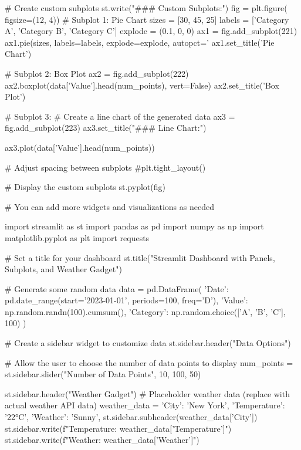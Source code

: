 # Create custom subplots
st.write("### Custom Subplots:")
fig = plt.figure( figsize=(12, 4))
# Subplot 1: Pie Chart
sizes = [30, 45, 25]
labels = ['Category A', 'Category B', 'Category C']
explode = (0.1, 0, 0)
ax1 = fig.add_subplot(221)
ax1.pie(sizes, labels=labels, explode=explode, autopct='%
ax1.set_title('Pie Chart')

# Subplot 2: Box Plot
ax2 = fig.add_subplot(222)
ax2.boxplot(data['Value'].head(num_points), vert=False)
ax2.set_title('Box Plot')


# Subplot 3: # Create a line chart of the generated data
ax3 = fig.add_subplot(223)
ax3.set_title("### Line Chart:")

ax3.plot(data['Value'].head(num_points))




# Adjust spacing between subplots
#plt.tight_layout()

# Display the custom subplots
st.pyplot(fig)

# You can add more widgets and visualizations as needed













import streamlit as st
import pandas as pd
import numpy as np
import matplotlib.pyplot as plt
import requests

# Set a title for your dashboard
st.title("Streamlit Dashboard with Panels, Subplots, and Weather Gadget")

# Generate some random data
data = pd.DataFrame({
    'Date': pd.date_range(start='2023-01-01', periods=100, freq='D'),
    'Value': np.random.randn(100).cumsum(),
    'Category': np.random.choice(['A', 'B', 'C'], 100)
})

# Create a sidebar widget to customize data
st.sidebar.header("Data Options")

# Allow the user to choose the number of data points to display
num_points = st.sidebar.slider("Number of Data Points", 10, 100, 50)

 
st.sidebar.header("Weather Gadget")
# Placeholder weather data (replace with actual weather API data)
weather_data = {
    'City': 'New York',
    'Temperature': '22°C',
    'Weather': 'Sunny',
}
st.sidebar.subheader(weather_data['City'])
st.sidebar.write(f"Temperature: {weather_data['Temperature']}")
st.sidebar.write(f"Weather: {weather_data['Weather']}")












